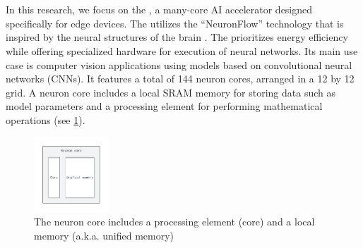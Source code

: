 \section{\graicore{}}
In this research, we focus on the \graicore{}, a many-core AI accelerator designed specifically for edge devices.
The \graicore{} utilizes the ``NeuronFlow'' technology that is inspired by the neural structures of the brain \cite{moreiraNeuronFlowNeuromorphicProcessor2020}.
The \graicore{} prioritizes energy efficiency while offering specialized hardware for execution of neural networks. 
Its main use case is computer vision applications using models based on convolutional neural networks (CNNs).
It features a total of 144 neuron cores, arranged in a 12 by 12 grid.
A neuron core includes a local SRAM memory for storing data such as model parameters and a processing element for performing mathematical operations (see \cref{fig:neuron_core}).

\begin{figure}[htbp]
    \centering
    \includegraphics[width=0.25\textwidth]{assets/neuron_core.pdf}
    \caption{The neuron core includes a processing element (core) and a local memory (a.k.a. unified memory)}
    \label{fig:neuron_core}
\end{figure}

